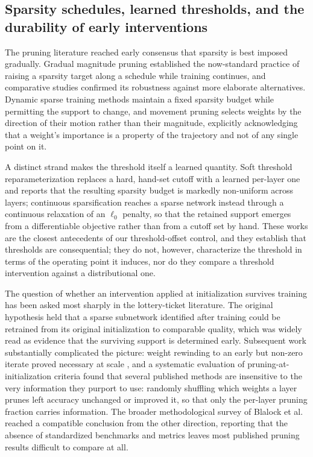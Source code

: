 \documentclass[final,5p,times,twocolumn]{elsarticle}
\theoremstyle{remark}
\begin{document}
\subsection{Sparsity schedules, learned thresholds, and the durability of
early interventions}
\label{sec:rel-sparsity}

The pruning literature reached early consensus that sparsity is best imposed
gradually. Gradual magnitude pruning \cite{zhu2017b} established the
now-standard practice of raising a sparsity target along a schedule while
training continues, and comparative studies \cite{gale2019} confirmed its
robustness against more elaborate alternatives. Dynamic sparse training
methods \cite{mocanu2018,evci2020} maintain a fixed sparsity budget while
permitting the support to change, and movement pruning \cite{sanh2020} selects
weights by the direction of their motion rather than their magnitude,
explicitly acknowledging that a weight's importance is a property of the
trajectory and not of any single point on it.

A distinct strand makes the threshold itself a learned quantity. Soft
threshold reparameterization \cite{kusupati2020} replaces a hard, hand-set
cutoff with a learned per-layer one and reports that the resulting sparsity
budget is markedly non-uniform across layers; continuous sparsification
\cite{savarese2020} reaches a sparse network instead through a continuous
relaxation of an $\ell_{0}$ penalty, so that the retained support emerges from
a differentiable objective rather than from a cutoff set by hand. These works are the closest antecedents
of our threshold-offset control, and they establish that thresholds are
consequential; they do not, however, characterize the threshold in terms of the
operating point it induces, nor do they compare a threshold intervention
against a distributional one.

The question of whether an intervention applied at initialization survives
training has been asked most sharply in the lottery-ticket literature. The
original hypothesis \cite{frankle2019} held that a sparse subnetwork
identified after training could be retrained from its original initialization
to comparable quality, which was widely read as evidence that the surviving
support is determined early. Subsequent work substantially complicated the
picture: weight rewinding to an early but non-zero iterate proved necessary at
scale \cite{frankle2020a}, and a systematic evaluation of
pruning-at-initialization criteria \cite{frankle2021} found that several
published methods are insensitive to the very information they purport to
use: randomly shuffling which weights a layer prunes left accuracy unchanged
or improved it, so that only the per-layer pruning fraction carries
information. The
broader methodological survey of Blalock et al.~\cite{blalock2020} reached a
compatible conclusion from the other direction, reporting that the absence of
standardized benchmarks and metrics leaves most published pruning results
difficult to compare at all.
\end{document}
